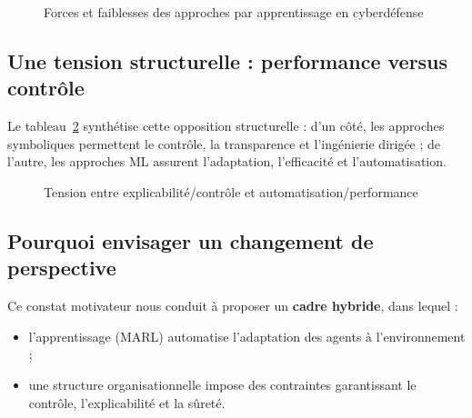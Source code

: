 \documentclass[ twoside,openright,titlepage,numbers=noenddot,headinclude,%
                footinclude=true,cleardoublepage=empty,abstractoff, %
                BCOR=5mm,paper=a4,fontsize=11pt,%
                french,american,%
                ]{scrreprt}
\begin{document}
\begin{figure}[H]
    \centering
    \caption{Forces et faiblesses des approches par apprentissage en cyberdéfense}
    \label{fig:limits_learning}
\end{figure}

\subsection{Une tension structurelle : performance versus contrôle}

Le tableau~\ref{fig:limits_tradeoff} synthétise cette opposition structurelle : d'un côté, les approches symboliques permettent le contrôle, la transparence et l'ingénierie dirigée ; de l'autre, les approches ML assurent l'adaptation, l'efficacité et l'automatisation.

\begin{figure}[H]
    \centering
    \caption{Tension entre explicabilité/contrôle et automatisation/performance}
    \label{fig:limits_tradeoff}
\end{figure}

\subsection{Pourquoi envisager un changement de perspective}

Ce constat motivateur nous conduit à proposer un \textbf{cadre hybride}, dans lequel :
\begin{itemize}
    \item l'apprentissage (MARL) automatise l'adaptation des agents à l'environnement ;
    \item une structure organisationnelle impose des contraintes garantissant le contrôle, l'explicabilité et la sûreté.
\end{itemize}
\end{document}
